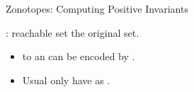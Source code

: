 

\begin{frame}{Zonotopes: Computing Positive Invariants}
%
\begin{minipage}{0.48\textwidth}
:  reachable set  the original set.
%
{\small
\begin{itemize}
\item {} to an  can be
encoded by .
\item Usual  only have
 as .
\end{itemize}
}
%
\end{minipage}
%
\begin{minipage}{0.48\textwidth}


\end{minipage}
\end{frame}
